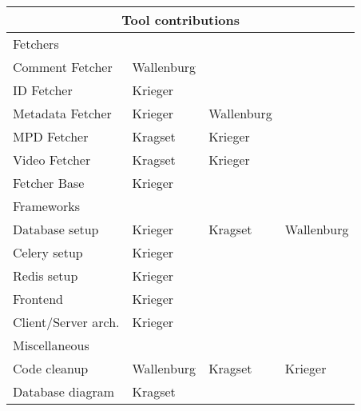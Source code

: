 \begin{appendix}
    \resizebox{8cm}{!} {
        \begin{tabular}{| l | l | l | l |}
            \hline
            \multicolumn{4}{|c|}{Tool contributions} \\
            \hline
            \multicolumn{4}{|l|}{Fetchers} \\
            \hline
            Comment Fetcher & Wallenburg & & \\
            ID Fetcher & Krieger & & \\
            Metadata Fetcher & Krieger & Wallenburg & \\
            MPD Fetcher & Kragset & Krieger & \\
            Video Fetcher & Kragset & Krieger & \\
            Fetcher Base & Krieger & & \\
            \hline
            \multicolumn{4}{|l|}{Frameworks} \\
            \hline
            Database setup & Krieger & Kragset & Wallenburg \\
            Celery setup & Krieger & & \\
            Redis setup & Krieger & & \\
            Frontend & Krieger & & \\
            Client/Server arch. & Krieger & & \\
            \hline
            \multicolumn{4}{|l|}{Miscellaneous} \\
            \hline
            Code cleanup & Wallenburg & Kragset & Krieger \\
            Database diagram & Kragset & & \\
            \hline
        \end{tabular}
    }

\end{appendix}
